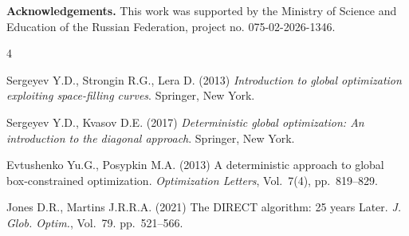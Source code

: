 \documentclass[oribibl]{llncs}
\begin{document}
\textbf{Acknowledgements.}
This work was supported by the Ministry of Science and Education of the Russian Federation, project no. 075-02-2026-1346.

 \vspace{0.5cm}

\begin{thebibliography}{4}

 Sergeyev Y.D., Strongin R.G., Lera D. (2013) \emph{Introduction to global optimization exploiting space-filling curves}. Springer, New York.

 Sergeyev Y.D., Kvasov D.E. (2017) \emph{Deterministic global optimization: An introduction to the diagonal approach}. Springer, New York.


 Evtushenko Yu.G., Posypkin M.A. (2013) A deterministic approach to global box-constrained optimization. \emph{Optimization Letters}, Vol.~7(4), pp.~819--829. 

 Jones D.R., Martins J.R.R.A. (2021) The DIRECT algorithm: 25 years Later. \emph{J. Glob. Optim.}, Vol.~79. pp.~521--566.




\end{thebibliography}
\end{document}
